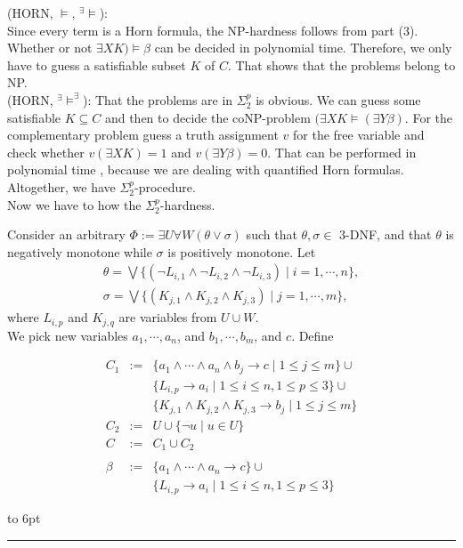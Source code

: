 \documentclass[12pt]{article}
\newcommand{\AM}{\mbox{$^\exists\!\!\models$}}
\newcommand{\AMB}{\mbox{$^\exists\!\!\models^\exists$}}
\newenvironment{proof}{\parindent=0pt{\bf Proof: }}{
   \hspace*{\fill}\hbox to 6pt{\leaders\hrule width 6pt height 6pt\hfill}\par}
\begin{document}
\begin{proof}
(HORN, $\models$, \AM):\\
Since every term is a Horn formula, the NP-hardness follows from part (3).
 Whether or not $\exists X K) \models \beta$ can be decided in polynomial time. Therefore, we only have to guess a satisfiable subset $K$ of $C$. That shows that the problems belong to NP.\\

(HORN, \AMB):  That the problems are in $\Sigma^p_2$ is obvious. We can guess some satisfiable $K \subseteq C$ and
then to decide the coNP-problem $(\exists X K \models (\exists Y \beta)$. For the complementary problem guess a
truth assignment $v$ for the free variable and check whether $v(\exists X K)=1$ and $v(\exists Y \beta)=0$.
That can be performed in polynomial time , because we are dealing with quantified Horn formulas. Altogether,
we have $\Sigma^p_2$-procedure.\\

Now we have to how the $\Sigma^p_2$-hardness.

\color{red}

Consider an arbitrary $\Phi:=\exists U\forall W (\theta\vee\sigma)$ such that $\theta, \sigma\in$ 3-DNF, and that $\theta$ is negatively monotone
while $\sigma$ is positively monotone.
%
Let $$\begin{array}{l}\theta=\bigvee\{(\neg L_{i,1}\wedge \neg L_{i,2}\wedge \neg L_{i,3})\mid i=1,\cdots,n\},\\ \sigma=\bigvee\{(K_{j,1}\wedge K_{j,2}\wedge K_{j,3})\mid j=1,\cdots,m\},\end{array}$$
where $L_{i,p}$ and $K_{j,q}$ are variables from $U\cup W$.\\

We pick new variables $a_1,\cdots, a_n$, and $b_1,\cdots, b_m$, and $c$. Define

$$\begin{array}{cll}C_1&:=&\{a_1\wedge\cdots\wedge a_n\wedge b_j\rightarrow c\mid 1\leq j\leq m\}\cup\\
&&\{L_{i,p}\rightarrow a_i\mid 1\leq i\leq n, 1\leq p\leq 3\}\cup\\
&&\{K_{j,1}\wedge K_{j,2}\wedge K_{j,3}\rightarrow b_j\mid 1\leq j\leq m\}\\
C_2&:=&U\cup\{\neg u\mid u\in U\}\\
C&:=&C_1\cup C_2\\ \\
\beta&:=&\{a_1\wedge\cdots\wedge a_n\rightarrow c\}\cup\\
&&\{L_{i,p}\rightarrow a_i \mid 1\leq i\leq n, 1\leq p\leq 3\}
\end{array}$$


\end{proof}
\end{document}
